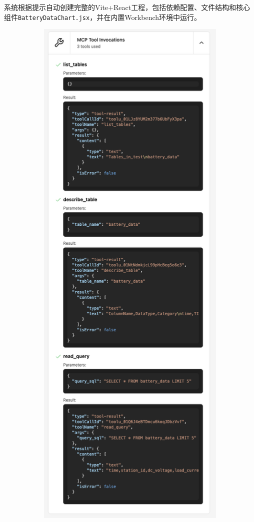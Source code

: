 系统根据提示自动创建完整的Vite+React工程，包括依赖配置、文件结构和核心组件\texttt{BatteryDataChart.jsx}，并在内置Workbench环境中运行。

\begin{figure}
  \centering
  \begin{subfigure}{0.48\textwidth}
    \centering
    \includegraphics[width=\textwidth]{figures/screenshots/iotdb-demo/mcp-call.png}

\end{subfigure}
\end{figure}
